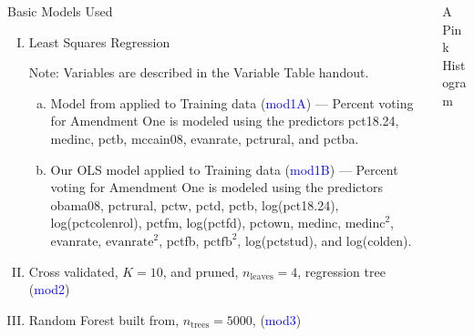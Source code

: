 \documentclass[final]{beamer}
\begin{document}
\begin{frame}[fragile]
\begin{columns}[t]
\begin{column}{0.31\linewidth}
\begin{minipage}[t][.955\textheight]{\linewidth}
\begin{block}{Basic Models Used}

\begin{enumerate}[I.]
\item Least Squares Regression
\vspace{0ex}

Note: Variables are described in the Variable Table handout.
\begin{enumerate}[a.]
\item Model from \cite{DE12} applied to Training data (\textcolor{blue}{mod1A}) --- Percent voting for Amendment One is modeled using the predictors pct18.24, medinc, pctb, mccain08, evanrate, pctrural, and pctba. 
\item Our OLS model applied to Training data (\textcolor{blue}{mod1B}) --- Percent voting for Amendment One is modeled using the predictors obama08, pctrural, pctw, pctd, pctb, log(pct18.24), log(pctcolenrol), pctfm, log(pctfd), pctown,  medinc, $\text{medinc}^2$, evanrate, $\text{evanrate}^2$, pctfb, $\text{pctfb}^2$, log(pctstud), and log(colden).
\end{enumerate}
\item Cross validated, $K = 10$, and pruned, $n_{\text{leaves}}=4$, regression tree \cite{JF09} (\textcolor{blue}{mod2})
\item Random Forest built from, $n_{\text{trees}} = 5000 $, \cite{AL02} (\textcolor{blue}{mod3})
\end{enumerate}
\vspace{0ex}

\end{block}
\vfill

\end{minipage}
\end{column}%


\begin{column}{0.31\linewidth}
\begin{minipage}[t][.955\textheight]{\linewidth} 

\vspace{0ex}
\begin{block}{A Pink Histogram}
\vspace{0ex}
\vspace{0ex}
\end{block}


\end{minipage}
\end{column}
\end{columns}
\end{frame}
\end{document}
